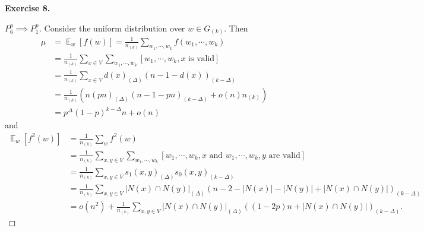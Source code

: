 \documentclass[a4paper]{article}
\newtheorem*{proof}{Proof}
\newenvironment{exercise}[1]{
	\par
	\noindent\textbf{Exercise #1.}\quad
}{
	\par
	\bigskip
}
\DeclareMathOperator{\E}{\mathbb E}
\newcommand{\pbra}[1]{\left( #1 \right)}
\newcommand{\sbra}[1]{\left[ #1 \right]}
\begin{document}
\begin{exercise}{8}
\begin{proof}[$P_6^p\implies P_1^p$]
        Consider the uniform distribution over $w\in G_{(k)}$. Then
        \begin{align*}
            \mu
            &=\E_w\sbra{f(w)}=\frac1{n_{(k)}}\sum_{w_1,\cdots,w_k}f(w_1,\cdots,w_k)\\
            &=\frac1{n_{(k)}}\sum_{x\in V}\sum_{w_1,\cdots,w_k}[w_1,\cdots,w_k,x\text{ is valid}]\\
            &=\frac1{n_{(k)}}\sum_{x\in V}d(x)_{(\Delta)}\pbra{n-1-d(x)}_{(k-\Delta)}\\
            &=\frac1{n_{(k)}}\pbra{n(pn)_{(\Delta)}(n-1-pn)_{(k-\Delta)}+o(n)n_{(k)}}\\
            &=p^\Delta(1-p)^{k-\Delta}n+o(n)
        \end{align*}
        and 
        \begin{align*}
            \E_w\sbra{f^2(w)}
            &=\frac1{n_{(k)}}\sum_wf^2(w)\\
            &=\frac1{n_{(k)}}\sum_{x,y\in V}\sum_{w_1,\cdots,w_k}[w_1,\cdots,w_k,x\text{ and }w_1,\cdots,w_k,y\text{ are valid}]\\
            &=\frac1{n_{(k)}}\sum_{x,y\in V}s_1(x,y)_{(\Delta)}s_0(x,y)_{(k-\Delta)}\\
            &=\frac1{n_{(k)}}\sum_{x,y\in V}|N(x)\cap N(y)|_{(\Delta)}\pbra{n-2-|N(x)|-|N(y)|+|N(x)\cap N(y)|}_{(k-\Delta)}\\
            &=o(n^2)+\frac1{n_{(k)}}\sum_{x,y\in V}|N(x)\cap N(y)|_{(\Delta)}\pbra{(1-2p)n+|N(x)\cap N(y)|}_{(k-\Delta)}.
        \end{align*}


\end{proof}
\end{exercise}
\end{document}
